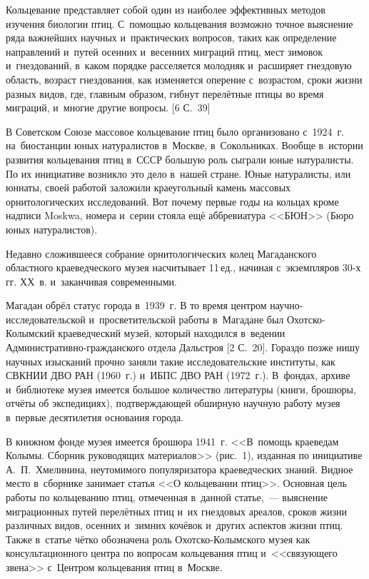  

\makeProcTitle
{}

Кольцевание представляет собой один из наиболее эффективных методов изучения биологии птиц. С~помощью кольцевания возможно точное выяснение ряда важнейших научных и~практических вопросов, таких как определение направлений и~путей осенних и~весенних миграций птиц, мест зимовок и~гнездований, в~каком порядке расселяется молодняк и~расширяет гнездовую область, возраст гнездования, как изменяется оперение с~возрастом, сроки жизни разных видов, где, главным образом, гибнут перелётные птицы во время миграций, и~многие другие вопросы. [6 С.~39]

В Советском Союзе массовое кольцевание птиц было организовано с~1924~г. на~биостанции юных натуралистов в~Москве, в~Сокольниках. Вообще в~истории развития кольцевания птиц в~СССР большую роль сыграли юные натуралисты. По их инициативе возникло это дело в~нашей стране. Юные натуралисты, или юннаты, своей работой заложили краеугольный камень массовых орнитологических исследований. Вот почему первые годы на кольцах кроме надписи Moskwa, номера и~серии стояла ещё аббревиатура <<БЮН>> (Бюро юных натуралистов).



Недавно сложившееся собрание орнитологических колец Магаданского областного краеведческого музея насчитывает 11\,ед., начиная с~экземпляров 30-х гг. ХХ~в. и~заканчивая современными.

Магадан обрёл статус города в~1939~г. В то время центром научно-исследовательской и~просветительской работы в~Магадане был Охотско-Колымский краеведческий музей, который находился в~ведении Ад\-ми\-нист\-ра\-тив\-но-гражданского отдела Дальстроя [2 С.~20]. Гораздо позже нишу научных изысканий прочно заняли такие исследовательские институты, как СВКНИИ ДВО РАН (1960~г.) и~ИБПС ДВО РАН (1972~г.). В~фондах, архиве и~библиотеке музея имеется большое количество литературы (книги, брошюры, отчёты об экспедициях), подтверждающей обширную научную работу музея в~первые десятилетия основания города.

В книжном фонде музея имеется брошюра 1941~г. <<В~помощь краеведам Колымы. Сборник руководящих материалов>> (рис.~1), изданная по инициативе А.~П.~Хмелинина, неутомимого популяризатора краеведческих знаний. Видное место в~сборнике занимает статья <<О кольцевании птиц>>. Основная цель работы по кольцеванию птиц, отмеченная в~данной статье,~--- выяснение миграционных путей перелётных птиц и~их гнездовых ареалов, сроков жизни различных видов, осенних и~зимних кочёвок и~других аспектов жизни птиц. Также в~статье чётко обозначена роль Охотско-Колымского музея как консультационного центра по вопросам кольцевания птиц и~<<связующего звена>> с~Центром кольцевания птиц в~Москве.

